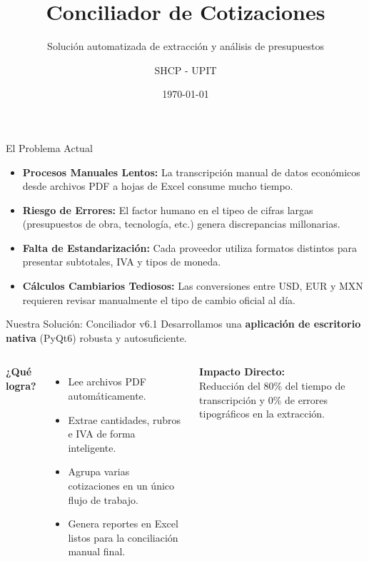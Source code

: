 \documentclass[aspectratio=169, 11pt]{beamer}
\title[Conciliador v6.1]{Conciliador de Cotizaciones}
\subtitle{Solución automatizada de extracción y análisis de presupuestos}
\author[SHCP - UPIT]{SHCP - UPIT}
\date{\today}
\begin{document}
\begin{frame}
    \titlepage
\end{frame}

\begin{frame}{El Problema Actual}
    \begin{itemize}[<+->]
        \item \textbf{Procesos Manuales Lentos:} La transcripción manual de datos económicos desde archivos PDF a hojas de Excel consume mucho tiempo.
        \item \textbf{Riesgo de Errores:} El factor humano en el tipeo de cifras largas (presupuestos de obra, tecnología, etc.) genera discrepancias millonarias.
        \item \textbf{Falta de Estandarización:} Cada proveedor utiliza formatos distintos para presentar subtotales, IVA y tipos de moneda.
        \item \textbf{Cálculos Cambiarios Tediosos:} Las conversiones entre USD, EUR y MXN requieren revisar manualmente el tipo de cambio oficial al día.
    \end{itemize}
\end{frame}

\begin{frame}{Nuestra Solución: Conciliador v6.1}
    Desarrollamos una \textbf{aplicación de escritorio nativa} (PyQt6) robusta y autosuficiente.
    
    \vspace{0.5cm}
    \begin{columns}
        \textbf{¿Qué logra?}
        \begin{itemize}
            \item Lee archivos PDF automáticamente.
            \item Extrae cantidades, rubros e IVA de forma inteligente.
            \item Agrupa varias cotizaciones en un único flujo de trabajo.
            \item Genera reportes en Excel listos para la conciliación manual final.
        \end{itemize}
        
        \begin{center}
            \colorbox{vino!10}{
                \parbox{0.9\textwidth}{
                \centering \textbf{\color{vino}Impacto Directo:}\\
                Reducción del 80\% del tiempo de transcripción y 0\% de errores tipográficos en la extracción.
                }
            }
        \end{center}
    \end{columns}
\end{frame}
\end{document}
